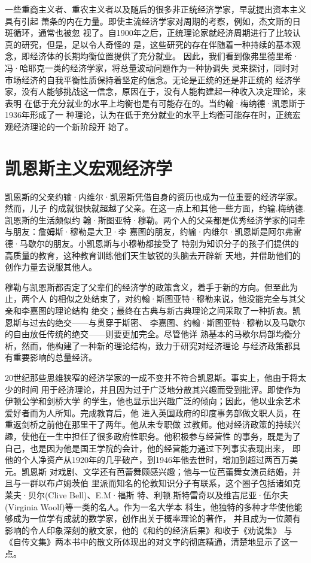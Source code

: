 一些重商主义者、重农主义者以及随后的很多非正统经济学家，早就提出资本主义具有引起
萧条的内在力量。即使主流经济学家对周期的考察，例如，杰文斯的日斑循环，通常也被忽
视了。自1900年之后，正统理论家就经济周期进行了比较认真的研究，但是，足以令人奇怪的
是，这些研究的存在伴随着一种持续的基本观念，即经济体的长期均衡位置提供了充分就业。
因此，我们看到像弗里德里希·冯·哈耶克一类的经济学家，将总量波动问题作为一种协调失
灵来探讨，同时对市场经济的自我平衡性质保持着坚定的信念。无论是正统的还是非正统的
经济学家，没有人能够挑战这一信念，原因在于，没有人能构建起一种收入决定理论，来表明
在低于充分就业的水平上均衡也是有可能存在的。当约翰·梅纳德·凯恩斯于1936年形成了一
种理论，认为在低于充分就业的水平上均衡可能存在时，正统宏观经济理论的一个新阶段开
始了。

\section{凯恩斯主义宏观经济学}

凯恩斯的父亲约输·内维尔·凯恩斯凭借自身的资历也成为一位重要的经济学家。然而，儿子
的成就很快就超越了父亲。在这一点上和其他一些方面，约输.梅纳德.凯恩斯的生活颇似约
翰·斯图亚特·穆勒。两个人的父亲都是优秀经济学家的同辈与朋友：詹姆斯·穆勒是大卫·李
嘉图的朋友，约输·内维尔·凯恩斯是阿尔弗雷德·马歇尔的朋友。小凯恩斯与小穆勒都接受了
特别为知识分子的孩子们提供的高质量的教育，这种教育训练他们天生敏锐的头脑去开辟新
天地，并借助他们的创作力量去说服其他人。

穆勒与凯恩斯都否定了父辈们的经济学的政策含义，着手于新的方向。但至此为止，两个人
的相似之处结束了，对约翰·斯图亚特·穆勒来说，他没能完全与其父亲和李嘉图的理论结构
绝交；最终在古典与新古典理论之间采取了一种折衷。凯恩斯与过去的绝交——与贯穿于斯密、
李嘉图、约翰·斯图亚特·穆勒以及马歇尔的自由放任传统的绝交——则要更加完全。尽管他详
熟基本的马歇尔局部均衡分析，然而，他构建了一种新的理论结构，致力于研究对经济理论
与经济政策都具有重要影响的总量经济。

20世纪那些思维狭窄的经济学家的一成不变并不符合凯恩斯。事实上，他由于将太少的时间
用于经济理论，并且因为过于广泛地分散其兴趣而受到批评。即使作为伊顿公学和剑桥大学
的学生，他也显示出兴趣广泛的倾向；因此，他以业余艺术爱好者而为人所知。完成教育后，他
进入英国政府的印度事务部做文职人员，在重返剑桥之前他在那里干了两年。他从未专职做
过教师。他对经济政策的持续兴趣，使他在一生中担任了很多政府性职务。他积极参与经营性
的事务，既是为了自己，也是因为他是国王学院的会计，他的经营能力通过下列事实表现出来，
即他的个人净资产从1920年的几乎破产，到1946年他去世时，增加到超过两百万美元。凯恩斯
对戏剧、文学还有芭蕾舞颇感兴趣；他与一位芭蕾舞女演员结婚，并且与一群以布卢姆茨伯
里派而知名的伦敦知识分子有联系，这个圈子包括诸如克莱夫·贝尔(Clive Bell)、E.M·福斯
特、利顿.斯特雷奇以及维吉尼亚·伍尔夫(Virginia Woolf)等一类的名人。作为一名大学本
科生，他独特的多种才华使他能够成为一位学有成就的数学家，创作出关于概率理论的著作，
并且成为一位颇有影响的令人印象深刻的散文家，他的《和约的经济后果》和收于《劝说集》
与《自传文集》两本书中的散文所体现出的对文字的彻底精通，清楚地显示了这一点。

